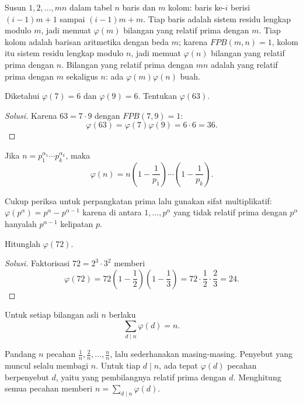 \documentclass[12pt]{scrartcl}
\begin{document}
Susun $1, 2, \dots, mn$ dalam tabel $n$ baris dan $m$ kolom:
baris ke-$i$ berisi $(i-1)m + 1$ sampai $(i-1)m + m$.
Tiap baris adalah sistem residu lengkap modulo $m$,
jadi memuat $\varphi(m)$ bilangan yang relatif prima dengan $m$.
Tiap kolom adalah barisan aritmetika dengan beda $m$;
karena $FPB(m, n) = 1$, kolom itu sistem residu lengkap modulo $n$,
jadi memuat $\varphi(n)$ bilangan yang relatif prima dengan $n$.
Bilangan yang relatif prima dengan $mn$ adalah yang relatif prima
dengan $m$ sekaligus $n$: ada $\varphi(m)\varphi(n)$ buah.

\begin{example}
Diketahui $\varphi(7) = 6$ dan $\varphi(9) = 6$. Tentukan $\varphi(63)$.
\end{example}
\begin{proof}[Solusi]
Karena $63 = 7 \cdot 9$ dengan $FPB(7, 9) = 1$:
\[ \varphi(63) = \varphi(7)\varphi(9) = 6 \cdot 6 = 36. \]
\end{proof}

\begin{theorem}
Jika $n = p_1^{\alpha_1} \cdots p_k^{\alpha_k}$, maka
\[ \varphi(n) = n\left(1 - \frac{1}{p_1}\right) \cdots \left(1 - \frac{1}{p_k}\right). \]
\end{theorem}

Cukup periksa untuk perpangkatan prima lalu gunakan sifat multiplikatif:
$\varphi(p^\alpha) = p^\alpha - p^{\alpha-1}$ karena di antara $1, \dots, p^\alpha$
yang tidak relatif prima dengan $p^\alpha$ hanyalah $p^{\alpha-1}$ kelipatan $p$.

\begin{example}
Hitunglah $\varphi(72)$.
\end{example}
\begin{proof}[Solusi]
Faktorisasi $72 = 2^3 \cdot 3^2$ memberi
\[ \varphi(72) = 72\left(1 - \frac{1}{2}\right)\left(1 - \frac{1}{3}\right)
= 72 \cdot \frac{1}{2} \cdot \frac{2}{3} = 24. \]
\end{proof}

\begin{theorem}[Gauss]
Untuk setiap bilangan asli $n$ berlaku
\[ \sum_{d \mid n} \varphi(d) = n. \]
\end{theorem}

Pandang $n$ pecahan $\frac{1}{n}, \frac{2}{n}, \dots, \frac{n}{n}$,
lalu sederhanakan masing-masing.
Penyebut yang muncul selalu membagi $n$.
Untuk tiap $d \mid n$, ada tepat $\varphi(d)$ pecahan berpenyebut $d$,
yaitu yang pembilangnya relatif prima dengan $d$.
Menghitung semua pecahan memberi $n = \sum_{d \mid n} \varphi(d)$.
\end{document}
